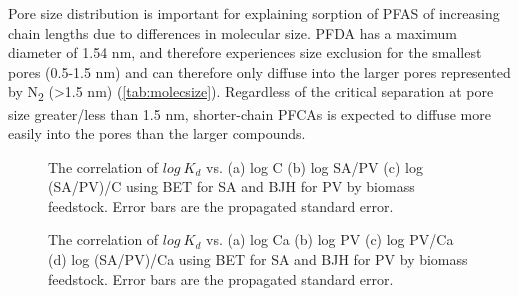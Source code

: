 Pore size distribution is important for explaining sorption of PFAS of increasing chain lengths due to differences in molecular size. PFDA has a maximum diameter of 1.54 nm, and therefore experiences size exclusion for the smallest pores (0.5-1.5 nm) and can therefore only diffuse into the larger pores represented by N\textsubscript{2} (\textgreater 1.5 nm) (\cref{tab:molecsize}). Regardless of the critical separation at pore size greater/less than 1.5 nm, shorter-chain PFCAs is expected to diffuse more easily into the pores than the larger compounds.  

\begin{figure}[!ht]
\hfill
{}
\hfill
{}
\caption{The correlation of $log~K_d$ vs. (a) log C (b) log SA/PV (c) log (SA/PV)/C using BET for SA and BJH for PV by biomass feedstock. Error bars are the propagated standard error.}
\label{fig:Kd_SAPV_C}
\end{figure}

\begin{figure}[!ht]
\hfill
{}
\hfill
{}
\hfill
{}
\caption{The correlation of $log~K_d$ vs. (a) log Ca (b) log PV (c) log PV/Ca (d) log (SA/PV)/Ca using BET for SA and BJH for PV by biomass feedstock. Error bars are the propagated standard error.}
\label{fig:Kd_SAPV_Ca}
\end{figure}

